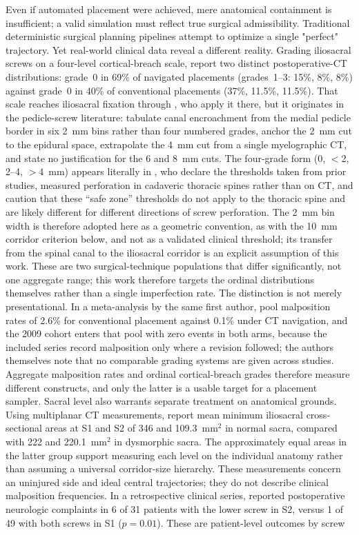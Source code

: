 \documentclass[9pt]{extarticle}
\begin{document}
Even if automated placement were achieved, mere anatomical containment is insufficient; a valid simulation must reflect true surgical admissibility. Traditional deterministic surgical planning pipelines \citep{liu2025pipeline} attempt to optimize a single "perfect" trajectory. Yet real-world clinical data reveal a different reality. Grading iliosacral screws on a four-level cortical-breach scale, \citet{zwingmann2009navigated} report two distinct postoperative-CT distributions: grade~0 in 69\% of navigated placements (grades~1--3: 15\%, 8\%, 8\%) against grade~0 in 40\% of conventional placements (37\%, 11.5\%, 11.5\%). That scale reaches iliosacral fixation through \citet{smith2006iliosacral}, who apply it there, but it originates in the pedicle-screw literature: \citet{gertzbein1990} tabulate canal encroachment from the medial pedicle border in six 2~mm bins rather than four numbered grades, anchor the 2~mm cut to the epidural space, extrapolate the 4~mm cut from a single myelographic CT, and state no justification for the 6 and 8~mm cuts. The four-grade form (0, $<$2, 2--4, $>$4~mm) appears literally in \citet{mirza2003}, who declare the thresholds taken from prior studies, measured perforation in cadaveric thoracic spines rather than on CT, and caution that these ``safe zone'' thresholds do not apply to the thoracic spine and are likely different for different directions of screw perforation. The 2~mm bin width is therefore adopted here as a geometric convention, as with the 10~mm corridor criterion below, and not as a validated clinical threshold; its transfer from the spinal canal to the iliosacral corridor is an explicit assumption of this work. These are two surgical-technique populations that differ significantly, not one aggregate range; this work therefore targets the ordinal distributions themselves rather than a single imperfection rate. The distinction is not merely presentational. In a meta-analysis by the same first author, \citet{zwingmann2013} pool malposition rates of 2.6\% for conventional placement against 0.1\% under CT navigation, and the 2009 cohort enters that pool with zero events in both arms, because the included series record malposition only where a revision followed; the authors themselves note that no comparable grading systems are given across studies. Aggregate malposition rates and ordinal cortical-breach grades therefore measure different constructs, and only the latter is a usable target for a placement sampler. Sacral level also warrants separate treatment on anatomical grounds. Using multiplanar CT measurements, \citet{gardner2010safezones} report mean minimum iliosacral cross-sectional areas at S1 and S2 of 346 and 109.3~mm$^2$ in normal sacra, compared with 222 and 220.1~mm$^2$ in dysmorphic sacra. The approximately equal areas in the latter group support measuring each level on the individual anatomy rather than assuming a universal corridor-size hierarchy. These measurements concern an uninjured side and ideal central trajectories; they do not describe clinical malposition frequencies. In a retrospective clinical series, \citet{vandenbosch2002} reported postoperative neurologic complaints in 6 of 31 patients with the lower screw in S2, versus 1 of 49 with both screws in S1 ($p=0.01$). These are patient-level outcomes by screw 
\end{document}
